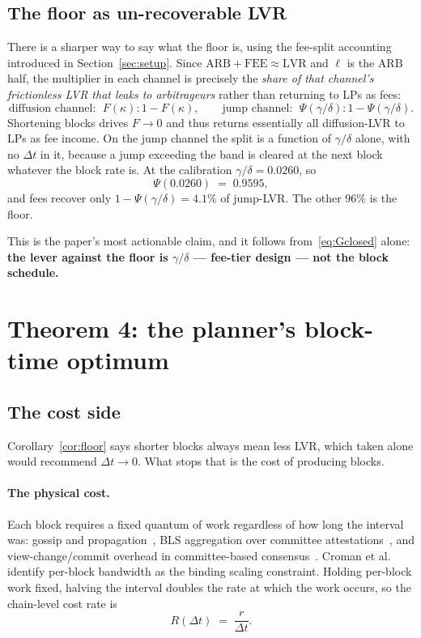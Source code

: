 \documentclass[11pt]{article}
\theoremstyle{definition}
\theoremstyle{remark}
\newcommand{\dt}{\Delta t}
\newcommand{\1}{\mathbf{1}}
\begin{document}
\subsection{The floor as un-recoverable LVR}

There is a sharper way to say what the floor is, using the fee-split accounting introduced in Section~\ref{sec:setup}. Since $\mathrm{ARB} + \mathrm{FEE} \approx \mathrm{LVR}$ and $\ell$ is the $\mathrm{ARB}$ half, the multiplier in each channel is precisely the \emph{share of that channel's frictionless LVR that leaks to arbitrageurs} rather than returning to LPs as fees:
\[
\text{diffusion channel: } \; F(\kappa) : 1 - F(\kappa),
\qquad
\text{jump channel: } \; \Psi(\gamma/\delta) : 1 - \Psi(\gamma/\delta).
\]
Shortening blocks drives $F \to 0$ and thus returns essentially all diffusion-LVR to LPs as fee income. On the jump channel the split is a function of $\gamma/\delta$ alone, with no $\dt$ in it, because a jump exceeding the band is cleared at the next block whatever the block rate is. At the calibration $\gamma/\delta = 0.0260$, so
\[
\Psi(0.0260) \;=\; 0.9595,
\]
and fees recover only $1 - \Psi(\gamma/\delta) = 4.1\%$ of jump-LVR. The other $96\%$ is the floor.

This is the paper's most actionable claim, and it follows from~\eqref{eq:Gclosed} alone: \textbf{the lever against the floor is $\gamma/\delta$ --- fee-tier design --- not the block schedule.}

\section{Theorem 4: the planner's block-time optimum}\label{sec:planner}

\subsection{The cost side}

Corollary~\ref{cor:floor} says shorter blocks always mean less LVR, which taken alone would recommend $\dt \to 0$. What stops that is the cost of producing blocks.

\paragraph{The physical cost.} Each block requires a fixed quantum of work regardless of how long the interval was: gossip and propagation~\cite{decker2013information}, BLS aggregation over committee attestations~\cite{buterin2022paths}, and view-change/commit overhead in committee-based consensus~\cite{benhaim2024scaling}. Croman et al.~\cite{croman2016scaling} identify per-block bandwidth as the binding scaling constraint. Holding per-block work fixed, halving the interval doubles the rate at which the work occurs, so the chain-level cost rate is
\[
R(\dt) \;=\; \frac{r}{\dt}.
\]
\end{document}
